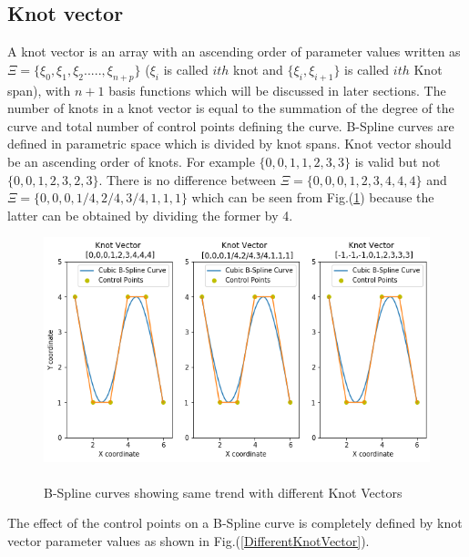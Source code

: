 \documentclass[11pt]{article}
\begin{document}
\subsection{Knot vector } \label{KnotVectorSection}
A knot vector is an array with an ascending order of parameter values written as $\Xi = \{ \xi_0,\xi_1,\xi_2.....,\xi_{n+p}\}$ ($\xi_i$ is called $ith$ knot and $\{\xi_i,\xi_{i+1}\}$ is called $ith$ Knot span), with $n+1$ basis functions which will be discussed in later sections. The number of knots in a knot vector is equal to the summation of the degree of the curve and total number of control points defining the curve. B-Spline curves are defined in parametric space which is divided by knot spans. Knot vector should be an ascending order of knots. For example $\{0,0,1,1,2,3,3\}$ is valid but not $\{0,0,1,2,3,2,3\}$. There is no difference between $\Xi = \{0,0,0,1,2,3,4,4,4\}$ and $\Xi = \{0,0,0,1/4,2/4,3/4,1,1,1\}$ which can be seen from Fig.(\ref{SameKnotVector}) because the latter can be obtained by dividing the former by 4.
\begin{figure}[H]
	\begin{center}
		\includegraphics[scale=0.8]{SameKnotVector.png} 
		\caption{\\B-Spline curves showing same trend with different Knot Vectors}\label{SameKnotVector}
	\end{center}	
\end{figure}
The effect of the control points on a B-Spline curve is completely defined by knot vector parameter values as shown in Fig.(\ref{DifferentKnotVector}).
\end{document}
